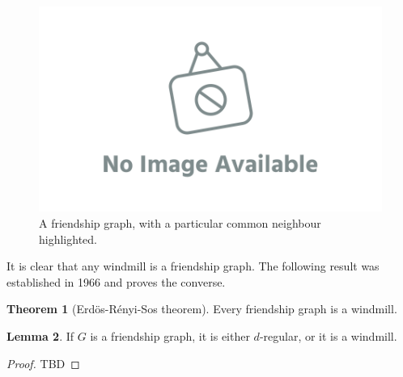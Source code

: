 \documentclass[12pt]{amsart}
\theoremstyle{definition}
\newtheorem{thm}{Theorem}[section]
\newtheorem{lm}[thm]{Lemma}
\begin{document}
\begin{figure}[h]
\includegraphics[scale=.1]{../imgs/ina.png}%
\caption{A friendship graph, with a particular common neighbour highlighted.\label{fig:friendship}}
\end{figure}

It is clear that any windmill is a friendship graph.
The following result was established in 1966 and proves the converse.

\begin{thm}[Erd\"os-R\'enyi-Sos theorem]\label{thm:ERS}
Every friendship graph is a windmill.
\end{thm}


\begin{lm}\label{lm:FWd}
If $G$ is a friendship graph, it is either $d$-regular, or it is a windmill.
\end{lm}


\begin{proof}
TBD
\end{proof}
\end{document}
